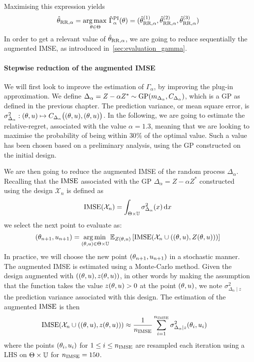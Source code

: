 \documentclass[../../Main_ManuscritThese.tex]{subfiles}
\begin{document}
Maximising this expression yields
\begin{equation}
  \hat{\theta}_{\mathrm{RR},\alpha} = \operatorname*{arg\,max \,}_{\theta\in\Theta} \hat{\Gamma}^{\mathrm{PI}}_{\alpha}(\theta) = (\hat{\theta}^{(1)}_{\mathrm{RR},\alpha}, \hat{\theta}^{(2)}_{\mathrm{RR},\alpha},\hat{\theta}^{(3)}_{\mathrm{RR},\alpha})
\end{equation}
In order to get a relevant value of $\hat{\theta}_{\mathrm{RR},\alpha}$,
we are going to reduce sequentially the augmented IMSE, as introduced
in~\cref{sec:evaluation_gamma}.

\paragraph{Stepwise reduction of the augmented IMSE}
We will first look to improve the estimation of $\Gamma_{\alpha}$, by
improving the plug-in approximation. We define
$\Delta_{\alpha} = Z - \alpha Z^* \sim \operatorname{\mathrm{GP}}(m_{\Delta_{\alpha}},
C_{\Delta_\alpha})$, which is a GP as defined in the previous chapter.
The prediction variance, or mean square error, is
$\sigma^2_{\Delta_{\alpha}}: (\theta, u) \mapsto
C_{\Delta_{\alpha}}\big((\theta, u), (\theta, u) \big)$. In the
following, we are going to estimate the relative-regret, associated
with the value $\alpha=1.3$, meaning that we are looking to maximise
the probability of being within $30\%$ of the optimal value. Such a
value has been chosen based on a preliminary analysis, using the GP
constructed on the initial design.


We are then going to reduce the augmented IMSE of the random process
$\Delta_{\alpha}$. Recalling that the $\operatorname{\mathrm{IMSE}}$ associated with the GP
$\Delta_{\alpha}=Z-\alpha Z^*$ constructed using the design
$\mathcal{X}_n$ is defined as
\begin{equation}
  \operatorname{\mathrm{IMSE}}(\mathcal{X}_n) = \int_{\Theta \times \mathbb{U}} \sigma^2_{\Delta_{\alpha}}(x) \,\mathrm{d}x
\end{equation}
we select the next point to evaluate as:
\begin{equation}
  \label{eq:aIMSE_criterion}
  (\theta_{n+1}, u_{n+1}) = \operatorname*{arg\,min \,}_{(\theta,u)\in\Theta\times \mathbb{U}} \mathbb{E}_{Z(\theta, u)}\left[\operatorname{\mathrm{IMSE}}(\mathcal{X}_n \cup \left((\theta, u), Z(\theta, u)\right))\right]
\end{equation}
In practice, we will choose the new point $(\theta_{n+1}, u_{n+1})$ in
a stochastic manner. The augmented IMSE is estimated using a
Monte-Carlo method. Given the design augmented with
$ \left((\theta, u), z(\theta, u)\right)$, in other words by making the
assumption that the function takes the value $z(\theta, u)>0$ at the point
$(\theta,u)$, we note $\sigma_{{\Delta_\alpha} \mid z}^2$ the
prediction variance associated with this design.
The estimation of the augmented $\operatorname{\mathrm{IMSE}}$ is then
\begin{align}
  \operatorname{\mathrm{IMSE}}(\mathcal{X}_n\cup \left((\theta, u), z(\theta, u)\right) ) &\approx \frac{1}{n_{\operatorname{\mathrm{IMSE}}}} \sum_{i=1}^{n_{\operatorname{\mathrm{IMSE}}}} \sigma_{\Delta_{\alpha} \mid z}^2(\theta_i, u_i)
\end{align}
where the points $(\theta_i, u_i)$ for $1\leq i \leq n_{\operatorname{\mathrm{IMSE}}}$ are
resampled each iteration using a LHS on $\Theta \times \mathbb{U}$ for
$n_{\operatorname{\mathrm{IMSE}}}=150$.
\end{document}
